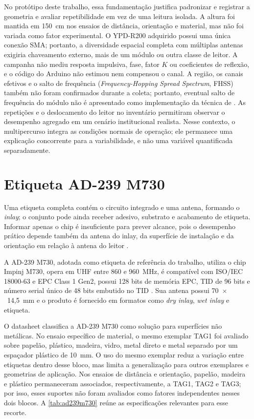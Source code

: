 No protótipo deste trabalho, essa fundamentação justifica padronizar e registrar a geometria e avaliar repetibilidade em vez de uma leitura isolada. A altura foi mantida em 150~cm nos ensaios de distância, orientação e material, mas não foi variada como fator experimental. O YPD-R200 adquirido possui uma única conexão SMA; portanto, a diversidade espacial completa com múltiplas antenas exigiria chaveamento externo, mais de um módulo ou outra classe de leitor. A campanha não mediu resposta impulsiva, fase, fator $K$ ou coeficientes de reflexão, e o código do Arduino não estimou nem compensou o canal. A região, os canais efetivos e o salto de frequência (\textit{Frequency-Hopping Spread Spectrum}, FHSS) também não foram confirmados durante a coleta; portanto, eventual salto de frequência do módulo não é apresentado como implementação da técnica de . As repetições e o deslocamento do leitor no inventário permitiram observar o desempenho agregado em um cenário institucional realista. Nesse contexto, o multipercurso integra as condições normais de operação; ele permanece uma explicação concorrente para a variabilidade, e não uma variável quantificada separadamente.

\section{Etiqueta AD-239 M730}

Uma etiqueta completa contém o circuito integrado e uma antena, formando o \textit{inlay}; o conjunto pode ainda receber adesivo, substrato e acabamento de etiqueta. Informar apenas o chip é insuficiente para prever alcance, pois o desempenho prático depende também da antena do inlay, da superfície de instalação e da orientação em relação à antena do leitor \cite{rao2005uhf}.

A AD-239 M730, adotada como etiqueta de referência do trabalho, utiliza o chip Impinj M730, opera em UHF entre 860 e 960~MHz, é compatível com ISO/IEC 18000-63 e EPC Class 1 Gen2, possui 128 bits de memória EPC, TID de 96 bits e número serial único de 48 bits embutido no TID \cite{avery2022ad239m730}. Sua antena possui 70~$\times$~14,5~mm e o produto é fornecido em formatos como \textit{dry inlay}, \textit{wet inlay} e etiqueta.

O datasheet classifica a AD-239 M730 como solução para superfícies não metálicas. No ensaio específico de material, o mesmo exemplar TAG1 foi avaliado sobre papelão, plástico, madeira, vidro, metal direto e metal separado por um espaçador plástico de 10~mm. O uso do mesmo exemplar reduz a variação entre etiquetas dentro desse bloco, mas limita a generalização para outros exemplares e geometrias de aplicação. Nos ensaios de distância e orientação, papelão, madeira e plástico permaneceram associados, respectivamente, a TAG1, TAG2 e TAG3; por isso, esses suportes não foram avaliados como fatores independentes nesses dois blocos. A \autoref{tab:ad239m730} reúne as especificações relevantes para esse recorte.

